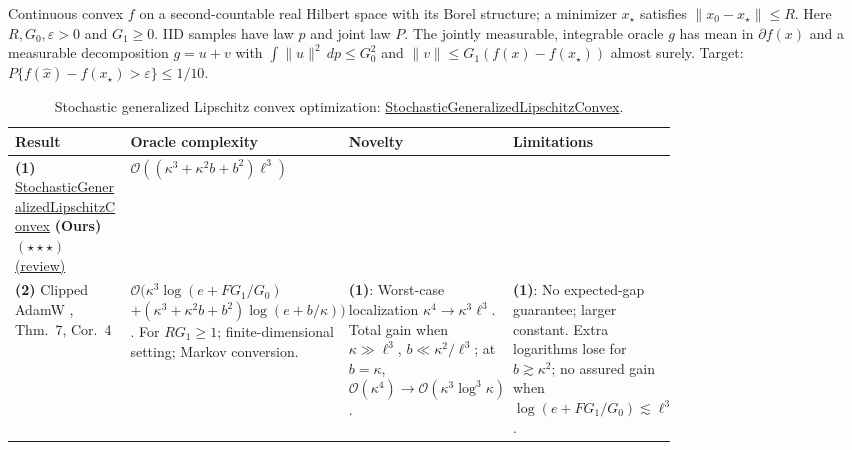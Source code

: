 \begin{table}[tp]
\centering
\caption{Stochastic generalized Lipschitz convex optimization: \href{https://github.com/k3nfalt/longtails/blob/main/LongTails/Setups/StochasticGeneralizedLipschitzConvex.lean}{StochasticGeneralizedLipschitzConvex}.}\label{tab:StochasticGeneralizedLipschitzConvex}
\parbox{\linewidth}{\footnotesize Continuous convex $f$ on a second-countable real Hilbert space with its Borel structure; a minimizer $x_\star$ satisfies $\|x_0-x_\star\|\le R$. Here $R,G_0,\varepsilon>0$ and $G_1\ge0$. IID samples have law $p$ and joint law $P$. The jointly measurable, integrable oracle $g$ has mean in $\partial f(x)$ and a measurable decomposition $g=u+v$ with $\int\|u\|^2\,dp\le G_0^2$ and $\|v\|\le G_1(f(x)-f(x_\star))$ almost surely. Target: $P\{f(\hat x)-f(x_\star)>\varepsilon\}\le1/10$.}\par\smallskip
\begin{threeparttable}
\footnotesize
\setlength{\tabcolsep}{4pt}\renewcommand{\arraystretch}{1.25}
\begin{tabularx}{\linewidth}{@{}>{\raggedright\arraybackslash}p{0.20\linewidth}>{\raggedright\arraybackslash}p{0.32\linewidth}>{\raggedright\arraybackslash}p{0.25\linewidth}>{\raggedright\arraybackslash}X@{}}
\toprule
\textbf{Result} & \textbf{Oracle complexity} & \textbf{Novelty} & \textbf{Limitations} \\
\midrule
\textbf{(1)} \href{https://github.com/k3nfalt/longtails/blob/main/LongTails/Theorems/StochasticGeneralizedLipschitzConvex.lean}{Stochastic\allowbreak Generalized\allowbreak Lipschitz\allowbreak Convex} \textbf{(Ours)} $(\star\star\star)$ \href{https://github.com/k3nfalt/longtails/blob/main/scripts/reviews/StochasticGeneralizedLipschitzConvex.md}{(review)} & $\mathcal{O}((\kappa^3+\kappa^2b+b^2)\ell^3)$ & & \\
\midrule[1.2pt]
\textbf{(2)} Clipped AdamW \citep{sglcKovalev2026v2}, Thm.~7, Cor.~4 & $\mathcal{O}\bigl(\kappa^3\log(e+FG_1/G_0)$\newline $+(\kappa^3+\kappa^2b+b^2)\log(e+b/\kappa)\bigr)$.
For $RG_1\ge1$; finite-dimensional setting; Markov conversion. & \textbf{(1)}: Worst-case localization $\kappa^4\to\kappa^3\ell^3$. Total gain when $\kappa\gg\ell^3$, $b\ll\kappa^2/\ell^3$; at $b=\kappa$, $\mathcal{O}(\kappa^4)\to\mathcal{O}(\kappa^3\log^3\kappa)$. & \textbf{(1)}: No expected-gap guarantee; larger constant. Extra logarithms lose for $b\gtrsim\kappa^2$; no assured gain when $\log(e+FG_1/G_0)\lesssim\ell^3$. \\
\midrule

\end{tabularx}
\end{threeparttable}
\end{table}
